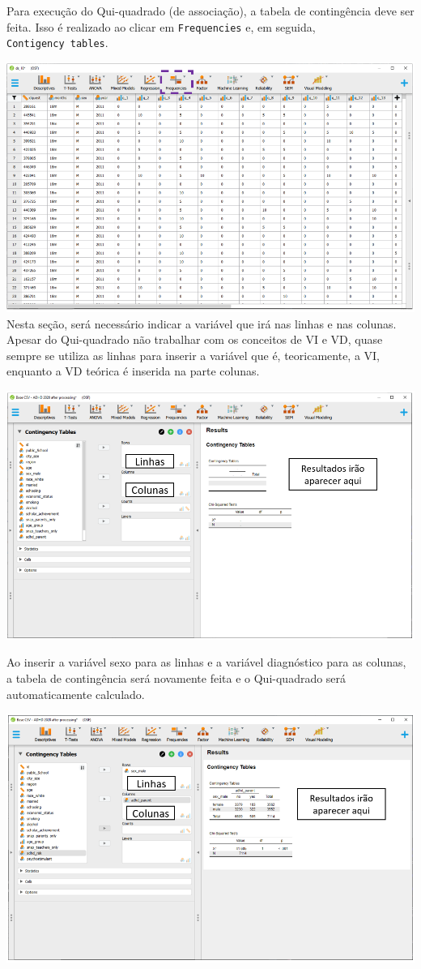 \documentclass[
]{book}
\begin{document}
Para execução do Qui-quadrado (de associação), a tabela de contingência deve ser feita. Isso é realizado ao clicar em \texttt{Frequencies} e, em seguida, \texttt{Contigency\ tables}.

\includegraphics{./img/cap_x2_interface.png}
Nesta seção, será necessário indicar a variável que irá nas linhas e nas colunas. Apesar do Qui-quadrado não trabalhar com os conceitos de VI e VD, quase sempre se utiliza as linhas para inserir a variável que é, teoricamente, a VI, enquanto a VD teórica é inserida na parte colunas.

\includegraphics{./img/cap_x2_interface2.png}

Ao inserir a variável sexo para as linhas e a variável diagnóstico para as colunas, a tabela de contingência será novamente feita e o Qui-quadrado será automaticamente calculado.

\includegraphics{./img/cap_x2_resultados.png}
\end{document}
